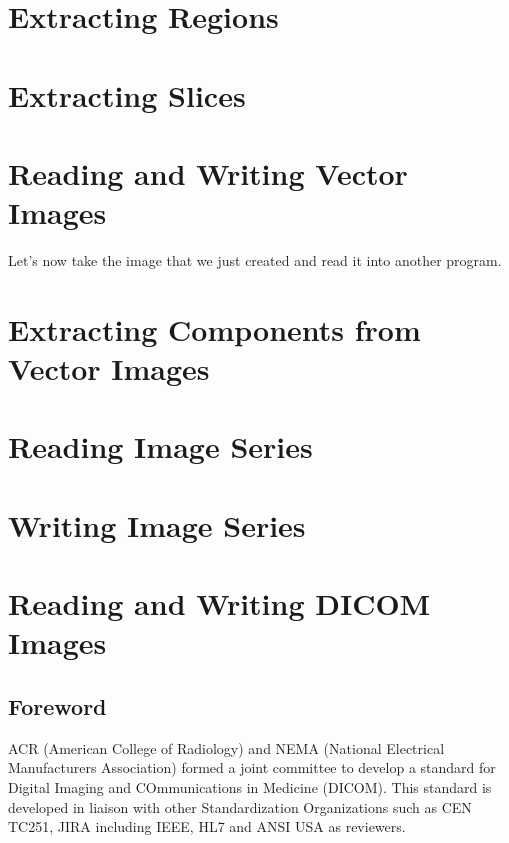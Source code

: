 \section{Extracting Regions}
\label{sec:ImagReadRegionOfInterestWrite}


\section{Extracting Slices}
\label{sec:ImagReadExtractWrite}


\section{Reading and Writing Vector Images}
\label{sec:VectorImagReadWrite}



Let's now take the image that we just created and read it into another program.




\section{Extracting Components from Vector Images}
\label{sec:VectorImageExtractComponent}


\section{Reading Image Series}
\label{sec:ReadingImageSeries}




\section{Writing Image Series}
\label{sec:WritingImageSeries}


\section{Reading and Writing DICOM Images}
\label{sec:ReadingDicomImageSeries2}


\subsection{Foreword}
ACR (American College of Radiology) and NEMA (National Electrical Manufacturers Association)
formed a joint committee to develop a standard for Digital Imaging and COmmunications in Medicine (DICOM).
This standard is developed in liaison with other Standardization Organizations such as CEN TC251, JIRA including IEEE, HL7 and ANSI USA as reviewers.

